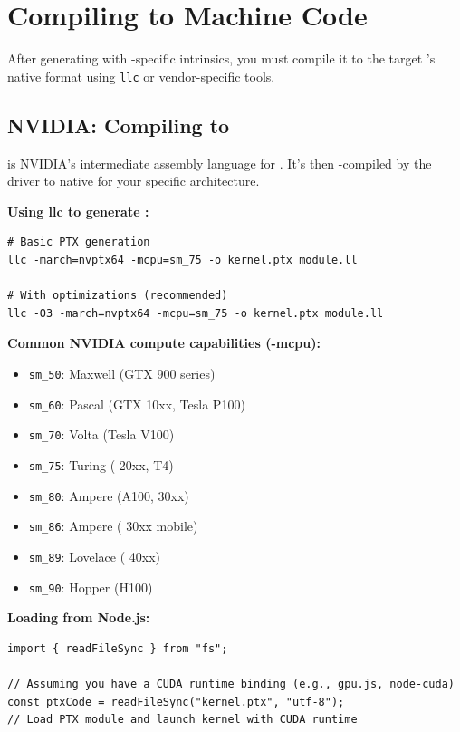 \section{Compiling    to Machine Code}
\label{sec:gpu-compilation}

After generating   with -specific intrinsics, you must compile it to the target 's native format using \texttt{llc} or vendor-specific tools.

\subsection{NVIDIA: Compiling   to }

\textbf{} is NVIDIA's intermediate assembly language for . It's then -compiled by the  driver to native  for your specific  architecture.

\textbf{Using llc to generate :}
\begin{lstlisting}[style=ir]
# Basic PTX generation
llc -march=nvptx64 -mcpu=sm_75 -o kernel.ptx module.ll

# With optimizations (recommended)
llc -O3 -march=nvptx64 -mcpu=sm_75 -o kernel.ptx module.ll
\end{lstlisting}

\textbf{Common NVIDIA compute capabilities (-mcpu):}
\begin{itemize}[noitemsep]
  \item \texttt{sm\_50}: Maxwell (GTX 900 series)
  \item \texttt{sm\_60}: Pascal (GTX 10xx, Tesla P100)
  \item \texttt{sm\_70}: Volta (Tesla V100)
  \item \texttt{sm\_75}: Turing ( 20xx, T4)
  \item \texttt{sm\_80}: Ampere (A100,  30xx)
  \item \texttt{sm\_86}: Ampere ( 30xx mobile)
  \item \texttt{sm\_89}:  Lovelace ( 40xx)
  \item \texttt{sm\_90}: Hopper (H100)
\end{itemize}

\textbf{Loading  from Node.js:}
\begin{lstlisting}[style=ts]
import { readFileSync } from "fs";

// Assuming you have a CUDA runtime binding (e.g., gpu.js, node-cuda)
const ptxCode = readFileSync("kernel.ptx", "utf-8");
// Load PTX module and launch kernel with CUDA runtime
\end{lstlisting}

